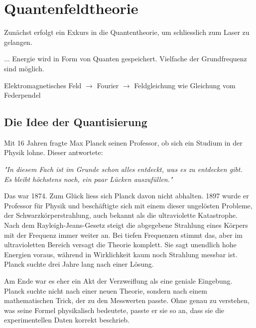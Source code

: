 %
%
%
%
\section{Quantenfeldtheorie
\label{fourier:section:quantenfeldtheorie}}
Zunächst erfolgt ein Exkurs in die Quantentheorie, um schliesslich zum Laser zu gelangen. %

...
Energie wird in Form von Quanten gespeichert.
Vielfache der Grundfrequenz sind möglich.

Elektromagnetisches Feld $\rightarrow$ Fourier $\rightarrow$ Feldgleichung wie Gleichung vom Federpendel


\subsection{Die Idee der Quantisierung
	\label{fourier:subsection:DieIdeeDerQuantisierung}}
	
	Mit 16 Jahren fragte Max Planck seinen Professor, ob sich ein Studium in der Physik lohne. 
	Dieser antwortete:
	
	\begin{center}
		\textit{"In diesem Fach ist im Grunde schon alles entdeckt, was es zu entdecken gibt.\\
			Es bleibt höchstens noch, ein paar Lücken auszufüllen."}
	\end{center}
	
	Das war 1874. 
	Zum Glück liess sich Planck davon nicht abhalten.
	1897 wurde er Professor für Physik und beschäftigte sich mit einem dieser ungelösten Probleme, der Schwarzkörperstrahlung, auch bekannt als die ultraviolette Katastrophe. 
	Nach dem Rayleigh-Jeans-Gesetz steigt die abgegebene Strahlung eines Körpers mit der Frequenz immer weiter an. Bei tiefen Frequenzen stimmt das, aber im ultravioletten Bereich versagt die Theorie komplett. 
	Sie sagt unendlich hohe Energien voraus, während in Wirklichkeit kaum noch Strahlung messbar ist.
	Planck suchte drei Jahre lang nach einer Lösung. 
	
	
	Am Ende war es eher ein Akt der Verzweiflung als eine geniale Eingebung. 
	Planck suchte nicht nach einer neuen Theorie, sondern nach einem mathematischen Trick, der zu den Messwerten passte.
	Ohne genau zu verstehen, was seine Formel physikalisch bedeutete, passte er sie so an, dass sie die experimentellen Daten korrekt beschrieb. 



